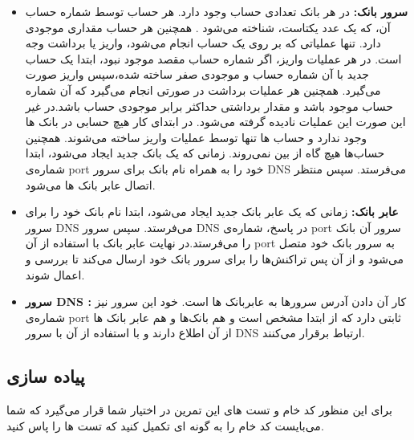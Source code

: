 \documentclass[]{article}
\begin{document}
\begin{itemize}


\item \textbf{سرور بانک:}
در هر بانک تعدادی حساب وجود دارد. هر حساب توسط شماره‌ حساب آن، که یک عدد یکتاست، شناخته می‌شود .
همچنین هر حساب مقداری موجودی دارد. تنها عملیاتی که بر روی یک حساب انجام می‌شود، واریز یا برداشت وجه است.
در هر عملیات واریز، اگر شماره حساب مقصد موجود نبود، ابتدا یک حساب جدید با آن شماره حساب و موجودی صفر ساخته شده،سپس  واریز صورت می‌گیرد. 
همچنین هر عملیات برداشت در صورتی انجام می‌گیرد که آن شماره حساب موجود باشد و مقدار برداشتی حداکثر برابر موجودی حساب باشد.در غیر این صورت این عملیات نادیده گرفته می‌شود.
در ابتدای کار هیچ حسابی در بانک ها وجود ندارد و حساب ها تنها توسط عملیات واریز ساخته می‌شوند.
همچنین حساب‌ها هیچ گاه از‌ بین نمی‌روند.
زمانی که یک بانک جدید ایجاد می‌شود، ابتدا شماره‌ی port خود را به همراه نام بانک برای سرور DNS می‌فرستد.
سپس منتظر اتصال عابر بانک ها می‌‌شود.

\item \textbf{عابر بانک:}
زمانی که یک عابر بانک جدید ایجاد می‌شود، ابتدا نام بانک خود را برای سرور DNS می‌فرستد.
سپس سرور DNS در پاسخ، شماره‌ی port سرور آن بانک را می‌فرستد.در نهایت عابر بانک با استفاده از آن port به سرور بانک خود متصل می‌شود و از آن پس تراکنش‌ها را برای سرور بانک خود ارسال می‌کند تا بررسی و اعمال شوند.

\item \textbf{سرور DNS :}
کار آن دادن آدرس سرورها به عابربانک ها است. خود این سرور نیز شماره‌ی port ثابتی دارد که از ابتدا مشخص است و هم بانک‌ها و هم عابر بانک ها از آن اطلاع دارند و با استفاده از آن با سرور DNS ارتباط برقرار می‌کنند.\end{itemize}




\subsection*{پیاده سازی}
برای این منظور کد خام و تست های این تمرین در اختیار شما قرار می‌‌گیرد که شما می‌بایست کد خام را به گونه ای تکمیل کنید که تست ها را پاس کنید.
\end{document}
